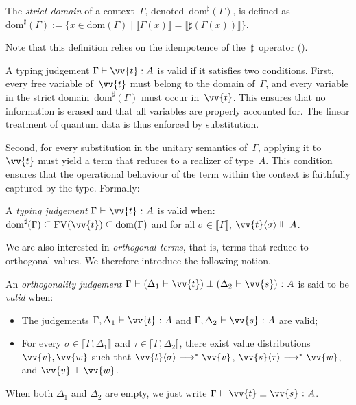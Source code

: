 \documentclass[runningheads,orivec,envcountsame,envcountsect]{llncs}
\newcommand\lra{\longrightarrow}
\newcommand\ansubst[2]{\ensuremath{\langle #1 \rangle_{#2}}}
\newcommand\dom[1]{\mathrm{dom}(#1)}
\newcommand\sdom[1]{\mathrm{dom}^{\sharp}(#1)}
\newcommand\FV[1]{\mathrm{FV}(#1)}
\def\eval{\lra^*}
\def\sem#1{\llbracket#1\rrbracket}
\def\TYP#1#2#3{#1~{\vdash}~#2~{:}~#3}
\def\SORTH#1#2#3#4{#1~{\vdash}~#2\perp#3~{:}~#4}
\def\ORTH#1#2#3#4#5#6{#1~{\vdash}~(#2~{\vdash}~#3)\perp(#4~{\vdash}~#5)~{:}~#6}
\def\real{\Vdash}
\begin{document}
\begin{definition}
  The \emph{strict domain} of a context~$\Gamma$, denoted~$\sdom{\Gamma}$, is
  defined as
  \(
    \sdom{\Gamma} :=
    \{x \in \dom{\Gamma} \mid
    \sem{\Gamma(x)} = \sem{\sharp(\Gamma(x))}\}
  \).
\end{definition}

Note that this definition relies on the idempotence of the~$\sharp$~operator
().


A typing judgement $\Gamma\vdash \vv{t}:A$ is valid if it satisfies two
conditions.  First, every free variable of~$\vv{t}$ must belong to the domain
of~$\Gamma$, and every variable in the strict domain~$\sdom{\Gamma}$ must occur
in~$\vv{t}$.  This ensures that no information is erased and that all variables
are properly accounted for.  The linear treatment of quantum data is thus
enforced by substitution.

Second, for every substitution in the unitary semantics of~$\Gamma$, applying
it to~$\vv{t}$ must yield a term that reduces to a realizer of type~$A$.  This
condition ensures that the operational behaviour of the term within the context
is faithfully captured by the type.  Formally:

\begin{definition}
  A \emph{typing judgement} $\TYP{\Gamma}{\vv{t}}{A}$ is valid when:
    $\sdom{\Gamma}\subseteq\FV{\vv{t}}\subseteq\dom{\Gamma}$
    and
    for all $\sigma\in\sem{\Gamma}$, 
          $\vv{t}\ansubst{\sigma}{}\real A$.
\end{definition}

We are also interested in \emph{orthogonal terms}, that is, terms that reduce
to orthogonal values.  
We therefore introduce the following notion.

\begin{definition}
  An \emph{orthogonality judgement}
  $\ORTH{\Gamma}{\Delta_1}{\vv{t}}{\Delta_2}{\vv{s}}{A}$
  is said to be \emph{valid} when:
  \begin{itemize}
    \item The judgements
      $\TYP{\Gamma,\Delta_1}{\vv{t}}{A}$ and
      $\TYP{\Gamma,\Delta_2}{\vv{s}}{A}$ are valid;
    \item For every
      $\sigma\in\sem{\Gamma,\Delta_1}$ and
      $\tau\in\sem{\Gamma,\Delta_2}$,
      there exist value distributions $\vv{v},\vv{w}$ such that
      $\vv{t}\ansubst{\sigma}{}\eval\vv{v}$,
      $\vv{s}\ansubst{\tau}{}\eval\vv{w}$,
      and $\vv{v}\perp\vv{w}$.
  \end{itemize}
When both $\Delta_1$ and $\Delta_2$ are empty,
we just write
$\SORTH{\Gamma}{\vv{t}}{\vv{s}}{A}$.
\end{definition}
\end{document}
